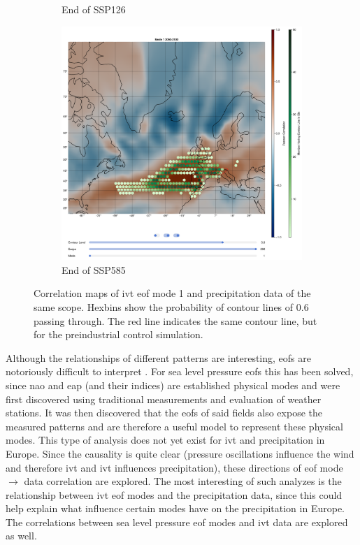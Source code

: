 \begin{figure}[!htb]
\begin{subfigure}[b]{0.49\textwidth}
    \caption{End of SSP126} 
    \label{fig:ivt eof pr cor ssp126 mode1}
  \end{subfigure}
  \begin{subfigure}[b]{0.49\textwidth}
    \includegraphics[width=\textwidth]{figures/ivt_pr_cor_mode1_ssp585_hexbin.png}
    \caption{End of SSP585}
    \label{fig:ivt eof pr cor ssp585 mode1}
  \end{subfigure}
  \caption[Correlation Maps of IVT EOF Mode 1 and PR Data]{Correlation maps of \ac{ivt} \ac{eof} mode 1 and precipitation data of the same scope. Hexbins show the probability of contour lines of $0.6$ passing through. The red line indicates the same contour line, but for the preindustrial control simulation.}
  \label{fig:ivt eof pr cor mode1}
\end{figure}

Although the relationships of different patterns are interesting, \acp{eof} are notoriously difficult to interpret \cite{hannachi_empirical_2007, dommenget_cautionary_2002}. 
For sea level pressure \acp{eof} this has been solved, since \ac{nao} and \ac{eap} (and their indices) are established physical modes and were first discovered using traditional measurements and evaluation of weather stations. 
It was then discovered that the \acp{eof} of said fields also expose the measured patterns and are therefore a useful model to represent these physical modes.  
This type of analysis does not yet exist for \ac{ivt} and precipitation in Europe. 
Since the causality is quite clear (pressure oscillations influence the wind and therefore \ac{ivt} and \ac{ivt} influences precipitation), these directions of \ac{eof} mode $\rightarrow$ data correlation are explored. 
The most interesting of such analyzes is the relationship between \ac{ivt} \ac{eof} modes and the precipitation data, since this could help explain what influence certain modes have on the precipitation in Europe. 
The correlations between sea level pressure \ac{eof} modes and \ac{ivt} data are explored as well.



